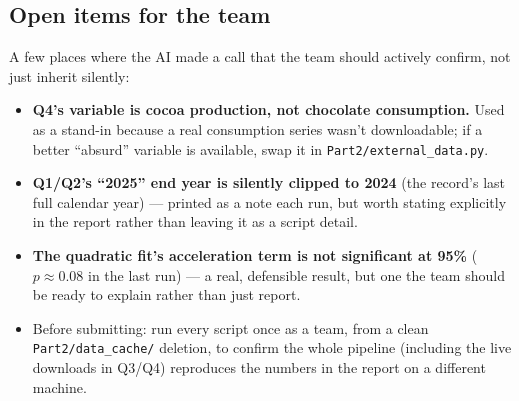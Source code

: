 \subsection*{Open items for the team}
\label{sec:open-items}

A few places where the AI made a call that the team should actively confirm, not just
inherit silently:

\begin{itemize}[leftmargin=*]
\item \textbf{Q4's variable is cocoa production, not chocolate consumption.} Used as a
stand-in because a real consumption series wasn't downloadable; if a better ``absurd''
variable is available, swap it in \texttt{Part2/external\_data.py}.
\item \textbf{Q1/Q2's ``2025'' end year is silently clipped to 2024} (the record's last full
calendar year) --- printed as a note each run, but worth stating explicitly in the report
rather than leaving it as a script detail.
\item \textbf{The quadratic fit's acceleration term is not significant at 95\%} ($p \approx
0.08$ in the last run) --- a real, defensible result, but one the team should be ready to
explain rather than just report.
\item Before submitting: run every script once as a team, from a clean
\texttt{Part2/data\_cache/} deletion, to confirm the whole pipeline (including the live
downloads in Q3/Q4) reproduces the numbers in the report on a different machine.
\end{itemize}


